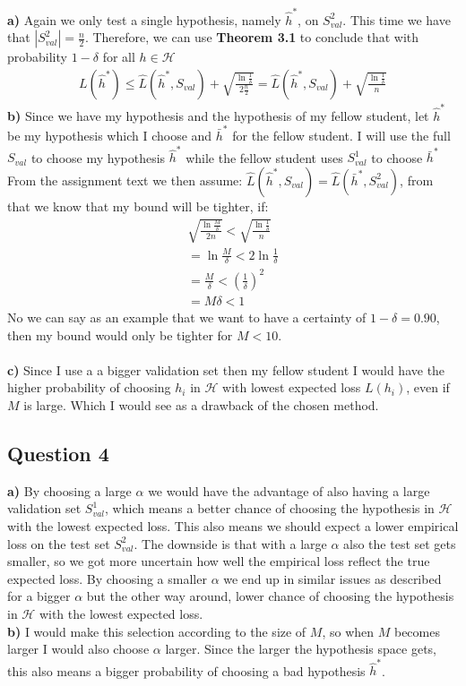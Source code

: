 \textbf{a)} Again we only test a single hypothesis, namely $\hat{h}^*$, on $S_{val}^2$. This time we have that $|S_{val}^2|=\frac{n}{2}$. Therefore, we can use \textbf{Theorem 3.1} to conclude that with probability $1 - \delta$ for all $h \in \mathcal{H}$
\begin{align}
L(\hat{h}^*) \leq \hat{L}(\hat{h}^*, S_{val}) + \sqrt{\frac{\ln \frac{1}{\delta}}{2\frac{n}{2}}} = \hat{L}(\hat{h}^*, S_{val}) + \sqrt{\frac{ \ln \frac{1}{\delta}}{n}}
\end{align}
\textbf{b)} 
Since we have my hypothesis and the hypothesis of my fellow student, let $\hat{h}^*$ be my hypothesis which I choose and $\bar{h}^*$ for the fellow student.
I will use the full $S_{val}$ to choose my hypothesis $\hat{h}^*$ while the fellow student uses $S^1_{val}$ to choose $\bar{h}^*$
From the assignment text we then assume:
$\hat{L}(\hat{h}^*,S_{val}) = \hat{L}(\bar{h}^*,S_{val}^2)$, from that we know that my bound will be tighter, if:
\begin{align}
\sqrt{\frac{\ln \frac{M}{\delta}}{2n}} < \sqrt{\frac{ \ln \frac{1}{\delta}}{n}}\\
= \ln \frac{M}{\delta} < 2 \ln \frac{1}{\delta}\\
= \frac{M}{\delta} < \left( \frac{1}{\delta} \right)^2\\
= M \delta < 1
\end{align}
No we can say as an example that we want to have a certainty of $1-\delta = 0.90$, then my bound would only be tighter for $M < 10$.\\\\
\textbf{c)} Since I use a a bigger validation set then my fellow student I would have the higher probability of choosing $h_i$ in $\mathcal{H}$ with lowest expected loss $L(h_i)$, even if $M$ is large. Which I would see as a drawback of the chosen method.
\subsection{Question 4}
\textbf{a)} By choosing a large $\alpha$ we would have the advantage of also having a large validation set $S_{val}^1$, which means a better chance of choosing the hypothesis in $\mathcal{H}$ with the lowest expected loss. This also means we should expect a lower empirical loss on the test set $S_{val}^2$.
The downside is that with a large $\alpha$ also the test set gets smaller, so we got more uncertain how well the empirical loss reflect the true expected loss.
By choosing a smaller $\alpha$ we end up in similar issues as described for a bigger $\alpha$ but the other way around, lower chance of choosing the hypothesis in $\mathcal{H}$ with the lowest expected loss.\\
\textbf{b)} I would make this selection according to the size of $M$, so when $M$ becomes larger I would also choose $\alpha$ larger.
Since the larger the hypothesis space gets, this also means a bigger probability of choosing a bad hypothesis $\hat{h}^*$.